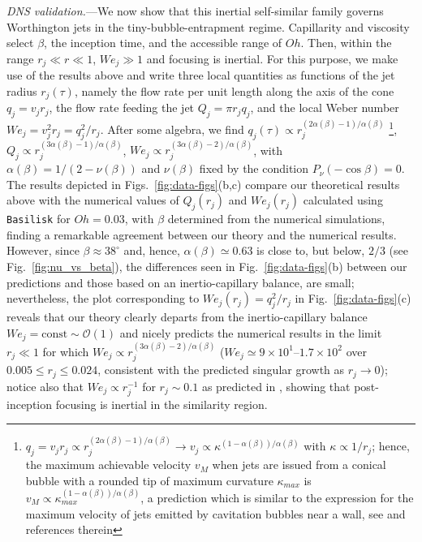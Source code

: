 \documentclass[twocolumn]{revtex4-2}
\begin{document}
\emph{DNS validation.}---We now show that this inertial self-similar family governs Worthington jets in the tiny-bubble-entrapment regime. Capillarity and viscosity select $\beta$, the inception time, and the accessible range of $Oh$. Then, within the range $r_j\ll r\ll1$, $We_j\gg1$ and focusing is inertial.
For this purpose, we make use of the results above and write three local quantities as functions of the jet radius $r_j(\tau)$, namely the flow rate per unit length along the axis of the cone $q_j=v_j r_j$, the flow rate feeding the jet $Q_j=\pi r_j q_j$, and the local Weber number $We_j=v^2_j r_j=q^2_j/r_j$. After some algebra, we find $q_j(\tau)\propto r_j^{(2\alpha(\beta)-1)/\alpha(\beta)}$ \footnote{$q_j=v_j r_j\propto r_j^{(2\alpha(\beta)-1)/\alpha(\beta)}\rightarrow v_j\propto \kappa^{(1-\alpha(\beta))/\alpha(\beta)}$ with $\kappa\propto 1/r_j$; hence, the maximum achievable velocity $v_M$ when jets are issued from a conical bubble with a rounded tip of maximum curvature $\kappa_{max}$ is $v_M\propto \kappa_{max}^{(1-\alpha(\beta))/\alpha(\beta)}$, a prediction which is similar to the expression for the maximum velocity of jets emitted by cavitation bubbles near a wall, see \cite{AMZhang2026} and references therein}, $Q_j\propto r_j^{(3\alpha(\beta)-1)/\alpha(\beta)}$, $We_j\propto r_j^{(3\alpha(\beta)-2)/\alpha(\beta)}$, with $\alpha(\beta)=1/(2-\nu(\beta))$ and $\nu(\beta)$ fixed by the condition $P_\nu(-\cos\beta)=0$. The results depicted in Figs.~\ref{fig:data-figs}(b,c) compare our theoretical results above with the numerical values of $Q_j(r_j)$ and $We_j(r_j)$ calculated using \texttt{Basilisk} \cite{Popinet2009,Popinet2015,Vatsal2021} for $Oh=0.03$, with $\beta$ determined from the numerical simulations, finding a remarkable agreement between our theory and the numerical results. However, since $\beta\approx 38^\circ$ and, hence, $\alpha(\beta)\simeq 0.63$ is close to, but below, $2/3$ (see Fig.~\ref{fig:nu_vs_beta}), the differences seen in Fig.~\ref{fig:data-figs}(b) between our predictions and those based on an inertio-capillary balance, are small; nevertheless, the plot corresponding to $We_j(r_j)=q^2_j/r_j$ in Fig.~\ref{fig:data-figs}(c)
reveals that our theory clearly departs from the inertio-capillary balance $We_j=\mathrm{const}\sim \mathcal{O}(1)$ and nicely predicts the numerical results in the limit $r_j\ll 1$ for which $We_j\propto r_j^{(3\alpha(\beta)-2)/\alpha(\beta)}$ ($We_j\simeq9\times10^1$--$1.7\times10^2$ over $0.005\le r_j\le0.024$, consistent with the predicted singular growth as $r_j\to0$); notice also that $We_j\propto r^{-1}_j$ for $r_j\sim 0.1$ as predicted in \cite{PRF2023}, showing that post-inception focusing is inertial in the similarity region.
\end{document}
